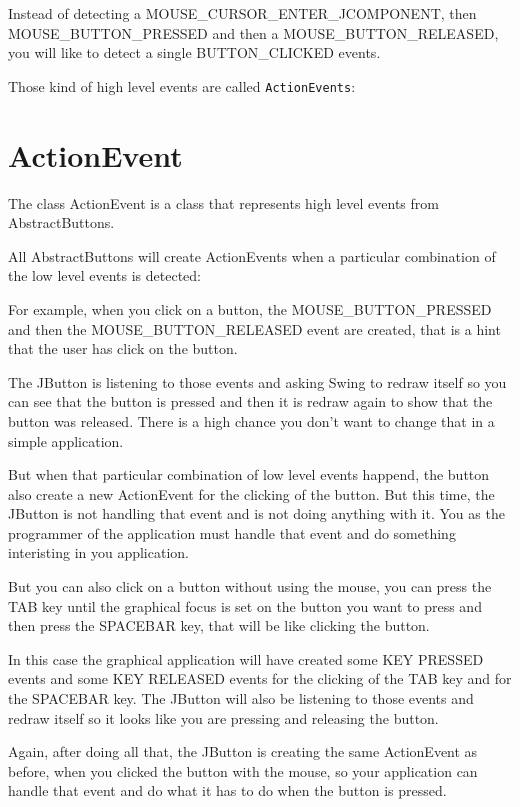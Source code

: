 \documentclass[a4paper, 9pt]{extarticle}
\begin{document}
Instead of detecting a MOUSE\_CURSOR\_ENTER\_JCOMPONENT, then MOUSE\_BUTTON\_PRESSED and
then a MOUSE\_BUTTON\_RELEASED, you will like to detect a single BUTTON\_CLICKED events.

Those kind of high level events are called \texttt{ActionEvents}:

\section{ActionEvent}

The class ActionEvent is a class that represents high level events from AbstractButtons.

All AbstractButtons will create ActionEvents when a particular combination of the
low level events is detected:

For example, when you click on a button, the MOUSE\_BUTTON\_PRESSED and then the
MOUSE\_BUTTON\_RELEASED event are created, that is a hint that the user has click
on the button.

The JButton is listening to those events and asking Swing to redraw itself so
you can see that the button is pressed and then it is redraw again to show that
the button was released. There is a high chance you don't want to change that
in a simple application.

But when that particular combination of low level events happend, the button
also create a new ActionEvent for the clicking of the button. But this time,
the JButton is not handling that event and is not doing anything with it. You
as the programmer of the application must handle that event and do something
interisting in you application.

But you can also click on a button without using the mouse, you can press the
TAB key until the graphical focus is set on the button you want to press and
then press the SPACEBAR key, that will be like clicking the button.

In this case the graphical application will have created some KEY PRESSED
events and some KEY RELEASED events for the clicking of the TAB key and for the
SPACEBAR key. The JButton will also be listening to those events and redraw itself
so it looks like you are pressing and releasing the button.

Again, after doing all that, the JButton is creating the same ActionEvent as
before, when you clicked the button with the mouse, so your application can
handle that event and do what it has to do when the button is pressed.
\end{document}
